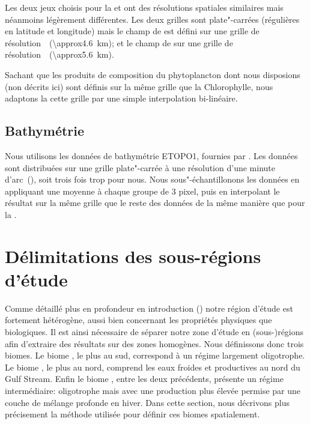 Les deux jeux choisis pour la  et  ont des résolutions spatiales similaires mais néanmoins légèrement différentes.
Les deux grilles sont plate"-carrées (régulières en latitude et longitude) mais le champ de  est défini sur une grille  de résolution~~(\qty{\approx4.6}{\km}); et le champ de  sur une grille  de résolution~~(\qty{\approx5.6}{\km}).

Sachant que les produits de composition du phytoplancton dont nous disposions (non décrits ici) sont définis sur la même grille que la Chlorophylle, nous adaptons la  cette grille par une simple interpolation bi-linéaire.

\subsection{Bathymétrie}
\label{sec:donnees-bathymetrie}

Nous utilisons les données de bathymétrie ETOPO1, fournies par .
Les données sont distribuées sur une grille plate"-carrée à une résolution d'une minute d'arc~(), soit trois fois trop pour nous.
Nous sous"-échantillonons les données en appliquant une moyenne à chaque groupe de 3 pixel, puis en interpolant le résultat sur la même grille que le reste des données de la même manière que pour la .

\section{Délimitations des sous-régions d'étude}
\label{sec:delimitations-regions}

Comme détaillé plus en profondeur en introduction () notre région d'étude est fortement hétérogène, aussi bien concernant les propriétés physiques que biologiques.
Il est ainsi nécessaire de séparer notre zone d'étude en (sous-)régions afin d'extraire des résultats sur des zones homogènes.
Nous définissons donc trois biomes.
Le biome , le plus au sud, correspond à un régime largement oligotrophe.
Le biome , le plus au nord, comprend les eaux froides et productives au nord du Gulf Stream.
Enfin le biome , entre les deux précédents, présente un régime intermédiaire: oligotrophe mais avec une production plus élevée permise par une couche de mélange profonde en hiver.
Dans cette section, nous décrivons plus précisement la méthode utilisée pour définir ces biomes spatialement.

